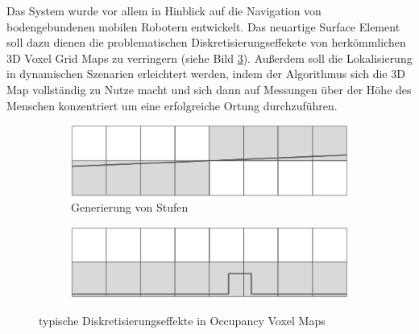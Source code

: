 Das System wurde vor allem in Hinblick auf die Navigation von bodengebundenen mobilen Robotern entwickelt. Das neuartige Surface Element soll dazu dienen die problematischen Diskretisierungseffekete von herkömmlichen 3D Voxel Grid Maps zu verringern (siehe Bild \ref{fig:discretization_effects}). Außerdem soll die Lokalisierung in dynamischen Szenarien erleichtert werden, indem der Algorithmus sich die 3D Map vollständig zu Nutze macht und sich dann auf Messungen über der Höhe des Menschen konzentriert um eine erfolgreiche Ortung durchzuführen.
\mbox{}
\begin{figure}[ht]
  \begin{subfigure}[t]{.5\textwidth}
    \centering
    \includegraphics[width=.9\linewidth]{pic/loesungen/12a_steps.png}
    \caption{Generierung von Stufen}
    \label{fig:s_12steps}
  \end{subfigure}\hfill
  \begin{subfigure}[t]{.5\textwidth}
    \centering
    \includegraphics[width=.9\linewidth]{pic/loesungen/12b_bumps.png}
    \caption{}
    \label{fig:s_12bumps}
  \end{subfigure}
  \caption{typische Diskretisierungseffekte in Occupancy Voxel Maps \cite{3DsurfelGridMaps}}
  \label{fig:discretization_effects}
\end{figure}
\mbox{}

\newpage
